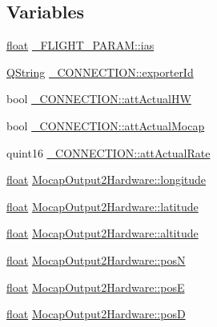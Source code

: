 \subsection*{Variables}
\begin{DoxyCompactItemize}
\item 
\hyperlink{_super_l_u_support_8h_a6a1bb6ed41f44b60e7bd83b0e9945aa7}{float} \hyperlink{group___mo_cap_plugin_ga30e6260b59e9997c3b1bec5bc9347ec3}{\-\_\-\-F\-L\-I\-G\-H\-T\-\_\-\-P\-A\-R\-A\-M\-::ias}
\item 
\hyperlink{group___u_a_v_objects_plugin_gab9d252f49c333c94a72f97ce3105a32d}{Q\-String} \hyperlink{group___mo_cap_plugin_ga2bff4ba6b082ec966a7075df9e19d66b}{\-\_\-\-C\-O\-N\-N\-E\-C\-T\-I\-O\-N\-::exporter\-Id}
\item 
bool \hyperlink{group___mo_cap_plugin_ga4d9a7f3563731377f2905f1b18e17d52}{\-\_\-\-C\-O\-N\-N\-E\-C\-T\-I\-O\-N\-::att\-Actual\-H\-W}
\item 
bool \hyperlink{group___mo_cap_plugin_gacd70b3a85672be0f8311fc107768c93f}{\-\_\-\-C\-O\-N\-N\-E\-C\-T\-I\-O\-N\-::att\-Actual\-Mocap}
\item 
quint16 \hyperlink{group___mo_cap_plugin_ga14fb71ed2eb43b817ee157f6cdcb84eb}{\-\_\-\-C\-O\-N\-N\-E\-C\-T\-I\-O\-N\-::att\-Actual\-Rate}
\item 
\hyperlink{_super_l_u_support_8h_a6a1bb6ed41f44b60e7bd83b0e9945aa7}{float} \hyperlink{group___mo_cap_plugin_ga65a9de4b87de2a4aaff0760f2b912407}{Mocap\-Output2\-Hardware\-::longitude}
\item 
\hyperlink{_super_l_u_support_8h_a6a1bb6ed41f44b60e7bd83b0e9945aa7}{float} \hyperlink{group___mo_cap_plugin_gacfbf5cf513abfc200b4fd5c14dad294c}{Mocap\-Output2\-Hardware\-::latitude}
\item 
\hyperlink{_super_l_u_support_8h_a6a1bb6ed41f44b60e7bd83b0e9945aa7}{float} \hyperlink{group___mo_cap_plugin_ga6f5725506a151cfd49e1c6b80c2e948f}{Mocap\-Output2\-Hardware\-::altitude}
\item 
\hyperlink{_super_l_u_support_8h_a6a1bb6ed41f44b60e7bd83b0e9945aa7}{float} \hyperlink{group___mo_cap_plugin_ga75792a6a49b67e8d7b63a219ca0f2ed2}{Mocap\-Output2\-Hardware\-::pos\-N}
\item 
\hyperlink{_super_l_u_support_8h_a6a1bb6ed41f44b60e7bd83b0e9945aa7}{float} \hyperlink{group___mo_cap_plugin_gaeb486e47d519b624cd7b598eb6f33169}{Mocap\-Output2\-Hardware\-::pos\-E}
\item 
\hyperlink{_super_l_u_support_8h_a6a1bb6ed41f44b60e7bd83b0e9945aa7}{float} \hyperlink{group___mo_cap_plugin_ga60ef031584e000727250ea18e4e0ce36}{Mocap\-Output2\-Hardware\-::pos\-D}

\end{DoxyCompactItemize}
